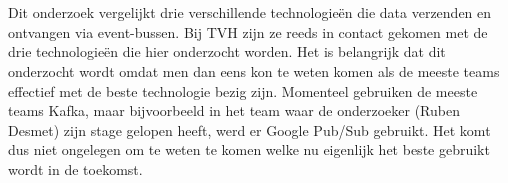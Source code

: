 
%
%

%



\chapter*{}
Dit onderzoek vergelijkt drie verschillende technologieën die data verzenden en ontvangen via event-bussen. Bij TVH zijn ze reeds in contact gekomen met de drie technologieën die hier onderzocht worden. Het is belangrijk dat dit onderzocht wordt omdat men dan eens kon te weten komen als de meeste teams effectief met de beste technologie bezig zijn. Momenteel gebruiken de meeste teams Kafka, maar bijvoorbeeld in het team waar de onderzoeker (Ruben Desmet) zijn stage gelopen heeft, werd er Google Pub/Sub gebruikt. Het komt dus niet ongelegen om te weten te komen welke nu eigenlijk het beste gebruikt wordt in de toekomst.

